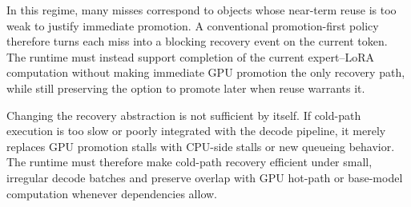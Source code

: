 \documentclass[sigplan,anonymous,review,10pt]{acmart}
\begin{document}
\label{subsec:challenge-miss}
In this regime, many misses correspond to objects whose near-term reuse is too weak to justify immediate promotion. A conventional promotion-first policy therefore turns each miss into a blocking recovery event on the current token. The runtime must instead support completion of the current expert--LoRA computation without making immediate GPU promotion the only recovery path, while still preserving the option to promote later when reuse warrants it.

\label{subsec:challenge-overlap}
Changing the recovery abstraction is not sufficient by itself. If cold-path execution is too slow or poorly integrated with the decode pipeline, it merely replaces GPU promotion stalls with CPU-side stalls or new queueing behavior. The runtime must therefore make cold-path recovery efficient under small, irregular decode batches and preserve overlap with GPU hot-path or base-model computation whenever dependencies allow.
\end{document}

